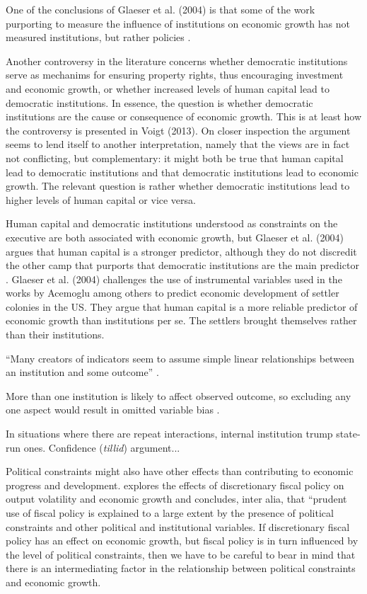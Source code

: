 \documentclass{article}\usepackage{graphicx, color}
\begin{document}
One of the conclusions of Glaeser et al. (2004) is that some of the
work purporting to measure the influence of institutions on economic
growth has not measured institutions, but rather policies \citep[p. 2]{voigt2013hownot}.

Another controversy in the literature concerns whether democratic
institutions serve as mechanims for ensuring property rights, thus
encouraging investment and economic growth, or whether increased levels
of human capital lead to democratic institutions. In essence, the
question is whether democratic institutions are the cause or consequence
of economic growth. This is at least how the controversy is presented
in Voigt (2013). On closer inspection the argument seems to lend itself
to another interpretation, namely that the views are in fact not conflicting,
but complementary: it might both be true that human capital lead to
democratic institutions and that democratic institutions lead to economic
growth. The relevant question is rather whether democratic institutions
lead to higher levels of human capital or vice versa.

Human capital and democratic institutions understood as constraints
on the executive are both associated with economic growth, but Glaeser
et al. (2004) argues that human capital is a stronger predictor, although
they do not discredit the other camp that purports that democratic
institutions are the main predictor \citep[p. 3]{voigt2013hownot}.
Glaeser et al. (2004) challenges the use of instrumental variables
used in the works by Acemoglu among others to predict economic development
of settler colonies in the US. They argue that human capital is a
more reliable predictor of economic growth than institutions per se.
The settlers brought themselves rather than their institutions.

``Many creators of indicators seem to assume simple linear relationships
between an institution and some outcome'' \citep[p. 10]{voigt2013hownot}.

More than one institution is likely to affect observed outcome, so
excluding any one aspect would result in omitted variable bias \citep[p. 11]{voigt2013hownot}.

In situations where there are repeat interactions, internal institution
trump state-run ones. Confidence (\emph{tillid}) argument...

Political constraints might also have other effects than contributing
to economic progress and development. \citet{fatas2003thecase} explores
the effects of discretionary fiscal policy on output volatility and
economic growth and concludes, inter alia, that \textquotedblleft{}prudent
use of fiscal policy is explained to a large extent by the presence
of political constraints and other political and institutional variables.
 If discretionary fiscal policy has an effect on economic growth,
but fiscal policy is in turn influenced by the level of political
constraints, then we have to be careful to bear in mind that there
is an intermediating factor in the relationship between political
constraints and economic growth.
\end{document}
